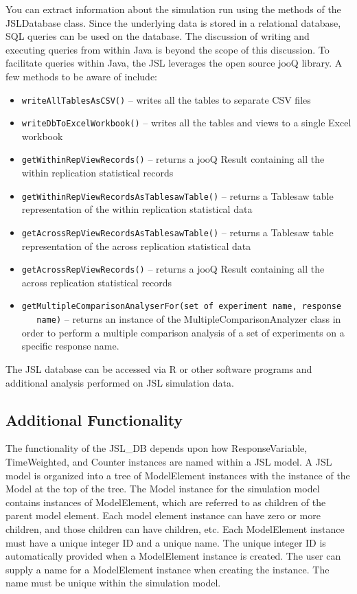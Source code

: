 \documentclass[
]{book}
\providecommand{\tightlist}{%
  \setlength{\itemsep}{0pt}\setlength{\parskip}{0pt}}
\theoremstyle{definition}
\theoremstyle{definition}
\theoremstyle{definition}
\theoremstyle{definition}
\theoremstyle{remark}
\begin{document}
You can extract information about the simulation run using the methods
of the JSLDatabase class. Since the underlying data is stored in a
relational database, SQL queries can be used on the database. The
discussion of writing and executing queries from within Java is beyond
the scope of this discussion. To facilitate queries within Java, the JSL
leverages the open source jooQ library. A few methods to be aware of
include:

\begin{itemize}
\tightlist
\item
  \texttt{writeAllTablesAsCSV()} -- writes all the tables to separate CSV files
\item
  \texttt{writeDbToExcelWorkbook()} -- writes all the tables and views to a single Excel workbook
\item
  \texttt{getWithinRepViewRecords()} -- returns a jooQ Result containing all the within replication statistical records
\item
  \texttt{getWithinRepViewRecordsAsTablesawTable()} -- returns a Tablesaw table representation of the within replication statistical data
\item
  \texttt{getAcrossRepViewRecordsAsTablesawTable()} -- returns a Tablesaw table
  representation of the across replication statistical data
\item
  \texttt{getAcrossRepViewRecords()} -- returns a jooQ Result containing all the
  across replication statistical records
\item
  \texttt{getMultipleComparisonAnalyserFor(set\ of\ experiment\ name,\ response\ \ \ \ \ name)} -- returns an instance of the MultipleComparisonAnalyzer class
  in order to perform a multiple comparison analysis of a set of
  experiments on a specific response name.
\end{itemize}

The JSL database can be accessed via R or other software programs and
additional analysis performed on JSL simulation data.

\hypertarget{additional-functionality}{%
\subsection{Additional Functionality}\label{additional-functionality}}

The functionality of the JSL\_DB depends upon how ResponseVariable,
TimeWeighted, and Counter instances are named within a JSL model. A JSL
model is organized into a tree of ModelElement instances with the
instance of the Model at the top of the tree. The Model instance for the
simulation model contains instances of ModelElement, which are referred
to as children of the parent model element. Each model element instance
can have zero or more children, and those children can have children,
etc. Each ModelElement instance must have a unique integer ID and a
unique name. The unique integer ID is automatically provided when a
ModelElement instance is created. The user can supply a name for a
ModelElement instance when creating the instance. The name must be
unique within the simulation model.
\end{document}
